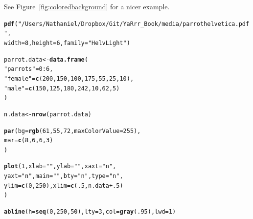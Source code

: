 \documentclass{tufte-book}\usepackage[]{graphicx}\usepackage[]{color}
\makeatletter
\newcommand{\hlnum}[1]{\textcolor[rgb]{0.686,0.059,0.569}{#1}}%
\newcommand{\hlstr}[1]{\textcolor[rgb]{0.192,0.494,0.8}{#1}}%
\newcommand{\hlopt}[1]{\textcolor[rgb]{0,0,0}{#1}}%
\newcommand{\hlstd}[1]{\textcolor[rgb]{0.345,0.345,0.345}{#1}}%
\newcommand{\hlkwb}[1]{\textcolor[rgb]{0.69,0.353,0.396}{#1}}%
\newcommand{\hlkwc}[1]{\textcolor[rgb]{0.333,0.667,0.333}{#1}}%
\newcommand{\hlkwd}[1]{\textcolor[rgb]{0.737,0.353,0.396}{\textbf{#1}}}%
\newenvironment{kframe}{%
 \def\at@end@of@kframe{}%
 \ifinner\ifhmode%
  \def\at@end@of@kframe{\end{minipage}}%
  \begin{minipage}{\columnwidth}%
 \fi\fi%
 \def\FrameCommand##1{\hskip\@totalleftmargin \hskip-\fboxsep
 \colorbox{shadecolor}{##1}\hskip-\fboxsep
     \hskip-\linewidth \hskip-\@totalleftmargin \hskip\columnwidth}%
 \MakeFramed {\advance\hsize-\width
   \@totalleftmargin\z@ \linewidth\hsize
   \@setminipage}}%
 {\par\unskip\endMakeFramed%
 \at@end@of@kframe}
\newenvironment{knitrout}{}{} %
\makeatother
\begin{document}
\begin{footnotesize}
\begin{itemize}
\begin{knitrout}
\end{knitrout}

See Figure~\ref{fig:coloredbackground} for a nicer example.

\begin{marginfigure}
\begin{tiny}
\begin{knitrout}
\color{fgcolor}\begin{kframe}
\begin{alltt}
\hlkwd{pdf}\hlstd{(}\hlstr{"/Users/Nathaniel/Dropbox/Git/YaRrr_Book/media/parrothelvetica.pdf"}\hlstd{,}
    \hlkwc{width} \hlstd{=} \hlnum{8}\hlstd{,} \hlkwc{height} \hlstd{=} \hlnum{6}\hlstd{,} \hlkwc{family} \hlstd{=} \hlstr{"HelvLight"}\hlstd{)}

\hlstd{parrot.data} \hlkwb{<-} \hlkwd{data.frame}\hlstd{(}
  \hlstr{"parrots"} \hlstd{=} \hlnum{0}\hlopt{:}\hlnum{6}\hlstd{,}
  \hlstr{"female"} \hlstd{=} \hlkwd{c}\hlstd{(}\hlnum{200}\hlstd{,} \hlnum{150}\hlstd{,} \hlnum{100}\hlstd{,} \hlnum{175}\hlstd{,} \hlnum{55}\hlstd{,} \hlnum{25}\hlstd{,} \hlnum{10}\hlstd{),}
  \hlstr{"male"} \hlstd{=} \hlkwd{c}\hlstd{(}\hlnum{150}\hlstd{,} \hlnum{125}\hlstd{,} \hlnum{180}\hlstd{,} \hlnum{242}\hlstd{,} \hlnum{10}\hlstd{,} \hlnum{62}\hlstd{,} \hlnum{5}\hlstd{)}
  \hlstd{)}

\hlstd{n.data} \hlkwb{<-} \hlkwd{nrow}\hlstd{(parrot.data)}

\hlkwd{par}\hlstd{(}\hlkwc{bg} \hlstd{=} \hlkwd{rgb}\hlstd{(}\hlnum{61}\hlstd{,} \hlnum{55}\hlstd{,} \hlnum{72}\hlstd{,} \hlkwc{maxColorValue} \hlstd{=} \hlnum{255}\hlstd{),}
    \hlkwc{mar} \hlstd{=} \hlkwd{c}\hlstd{(}\hlnum{8}\hlstd{,} \hlnum{6}\hlstd{,} \hlnum{6}\hlstd{,} \hlnum{3}\hlstd{)}
    \hlstd{)}

\hlkwd{plot}\hlstd{(}\hlnum{1}\hlstd{,} \hlkwc{xlab} \hlstd{=} \hlstr{""}\hlstd{,} \hlkwc{ylab} \hlstd{=} \hlstr{""}\hlstd{,} \hlkwc{xaxt} \hlstd{=} \hlstr{"n"}\hlstd{,}
     \hlkwc{yaxt} \hlstd{=} \hlstr{"n"}\hlstd{,} \hlkwc{main} \hlstd{=} \hlstr{""}\hlstd{,} \hlkwc{bty} \hlstd{=} \hlstr{"n"}\hlstd{,} \hlkwc{type} \hlstd{=} \hlstr{"n"}\hlstd{,}
     \hlkwc{ylim} \hlstd{=} \hlkwd{c}\hlstd{(}\hlnum{0}\hlstd{,} \hlnum{250}\hlstd{),} \hlkwc{xlim} \hlstd{=} \hlkwd{c}\hlstd{(}\hlnum{.5}\hlstd{, n.data} \hlopt{+} \hlnum{.5}\hlstd{)}
     \hlstd{)}

\hlkwd{abline}\hlstd{(}\hlkwc{h} \hlstd{=} \hlkwd{seq}\hlstd{(}\hlnum{0}\hlstd{,} \hlnum{250}\hlstd{,} \hlnum{50}\hlstd{),} \hlkwc{lty} \hlstd{=} \hlnum{3}\hlstd{,} \hlkwc{col} \hlstd{=} \hlkwd{gray}\hlstd{(}\hlnum{.95}\hlstd{),} \hlkwc{lwd} \hlstd{=} \hlnum{1}\hlstd{)}


\end{alltt}
\end{kframe}
\end{knitrout}
\end{tiny}
\end{marginfigure}
\end{itemize}
\end{footnotesize}
\end{document}
